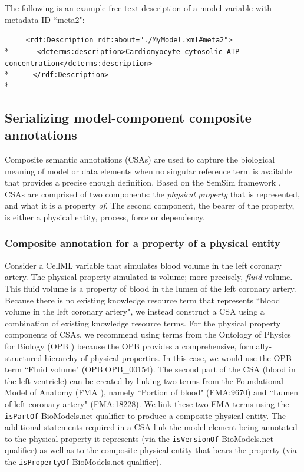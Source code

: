 \documentclass[pdftex,rgb,dvipsnames,svgnames,hyperref,table]{report}
\begin{document}
The following is an example free-text description of a model variable with metadata ID ``meta2": 

 \verb|     <rdf:Description rdf:about="./MyModel.xml#meta2">|\\*
 \verb|      <dcterms:description>Cardiomyocyte cytosolic ATP concentration</dcterms:description>|\\*
 \verb|     </rdf:Description>|\\*
 

\subsection{Serializing model-component composite annotations} \label{CSAs}
Composite semantic annotations (CSAs) are used to capture the biological meaning of model or data elements when no singular reference term is available that provides a precise enough definition. Based on the SemSim framework \cite{Gennari2011}, CSAs are comprised of two components: the \textit{physical property} that is represented, and what it is a property \textit{of}. The second component, the bearer of the property, is either a physical entity, process, force or dependency. 

\subsubsection{Composite annotation for a property of a physical entity}
\label{CSAentity}

Consider a CellML variable that simulates blood volume in the left coronary artery. The physical property simulated is volume; more precisely, \textit{fluid} volume. This fluid volume is a property of blood in the lumen of the left coronary artery. Because there is no existing knowledge resource term that represents ``blood volume in the left coronary artery", we instead construct a CSA using a combination of existing knowledge resource terms. For the physical property components of CSAs, we recommend using terms from the Ontology of Physics for Biology (OPB \cite{OPB}) because the OPB provides a comprehensive, formally-structured hierarchy of physical properties. In this case, we would use the OPB term ``Fluid volume" (OPB:OPB\_00154). The second part of the CSA (blood in the left ventricle) can be created by linking two terms from the Foundational Model of Anatomy (FMA \cite{FMA}), namely ``Portion of blood" (FMA:9670) and ``Lumen of left coronary artery" (FMA:18228). We link these two FMA terms using the \texttt{isPartOf} BioModels.net qualifier to produce a composite physical entity. The additional statements required in a CSA link the model element being annotated to the physical property it represents (via the \texttt{isVersionOf} BioModels.net qualifier) as well as to the composite physical entity that bears the property (via the \texttt{isPropertyOf} BioModels.net qualifier).
\end{document}
